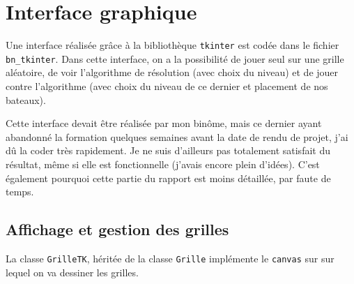 \chapter{Interface graphique}

Une interface réalisée grâce à la bibliothèque \texttt{tkinter} est codée dans le fichier \texttt{bn\_tkinter}. Dans cette interface, on a la possibilité de jouer seul sur une grille aléatoire, de voir l'algorithme de résolution (avec choix du niveau) et de jouer contre l'algorithme (avec choix du niveau de ce dernier et placement de nos bateaux).

Cette interface devait être réalisée par mon binôme, mais ce dernier ayant abandonné la formation quelques semaines avant la date de rendu de projet, j'ai dû la coder très rapidement. Je ne suis d'ailleurs pas totalement satisfait du résultat, même si elle est fonctionnelle (j'avais encore plein d'idées). C'est également pourquoi cette partie du rapport est moins détaillée, par faute de temps.

%
%
%
%
%
%

\section{Affichage et gestion des grilles}
La classe \texttt{GrilleTK}, héritée de la classe \texttt{Grille} implémente le \texttt{canvas} sur sur lequel on va dessiner les grilles.

